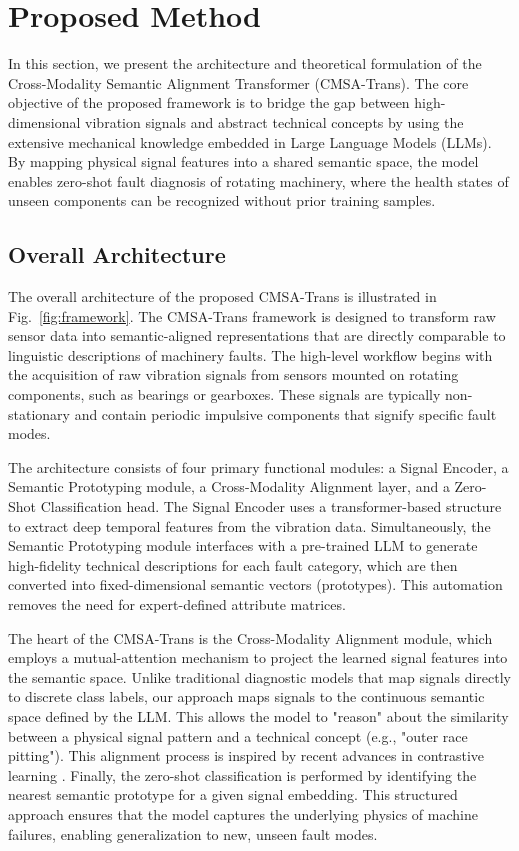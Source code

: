 \section{Proposed Method}
In this section, we present the architecture and theoretical formulation of the Cross-Modality Semantic Alignment Transformer (CMSA-Trans). The core objective of the proposed framework is to bridge the gap between high-dimensional vibration signals and abstract technical concepts by using the extensive mechanical knowledge embedded in Large Language Models (LLMs). By mapping physical signal features into a shared semantic space, the model enables zero-shot fault diagnosis of rotating machinery, where the health states of unseen components can be recognized without prior training samples.

\subsection{Overall Architecture}
The overall architecture of the proposed CMSA-Trans is illustrated in Fig.~\ref{fig:framework}. The CMSA-Trans framework is designed to transform raw sensor data into semantic-aligned representations that are directly comparable to linguistic descriptions of machinery faults. The high-level workflow begins with the acquisition of raw vibration signals from sensors mounted on rotating components, such as bearings or gearboxes. These signals are typically non-stationary and contain periodic impulsive components that signify specific fault modes.

The architecture consists of four primary functional modules: a Signal Encoder, a Semantic Prototyping module, a Cross-Modality Alignment layer, and a Zero-Shot Classification head. The Signal Encoder uses a transformer-based structure \cite{vaswani2017attention, zerveas2021transformer} to extract deep temporal features from the vibration data. Simultaneously, the Semantic Prototyping module interfaces with a pre-trained LLM \cite{radford2021learning} to generate high-fidelity technical descriptions for each fault category, which are then converted into fixed-dimensional semantic vectors (prototypes). This automation removes the need for expert-defined attribute matrices.

The heart of the CMSA-Trans is the Cross-Modality Alignment module, which employs a mutual-attention mechanism to project the learned signal features into the semantic space. Unlike traditional diagnostic models that map signals directly to discrete class labels, our approach maps signals to the continuous semantic space defined by the LLM. This allows the model to "reason" about the similarity between a physical signal pattern and a technical concept (e.g., "outer race pitting"). This alignment process is inspired by recent advances in contrastive learning \cite{radford2021learning, oord2018representation, chen2020simple}. Finally, the zero-shot classification is performed by identifying the nearest semantic prototype for a given signal embedding. This structured approach ensures that the model captures the underlying physics of machine failures, enabling generalization to new, unseen fault modes.

